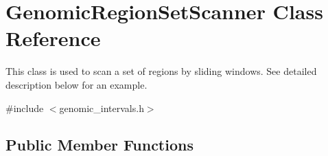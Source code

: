 \hypertarget{classGenomicRegionSetScanner}{
\section{GenomicRegionSetScanner Class Reference}
\label{classGenomicRegionSetScanner}
}


This class is used to scan a set of regions by sliding windows. See detailed description below for an example.  




{\ttfamily \#include $<$genomic\_\-intervals.h$>$}

\subsection*{Public Member Functions}
